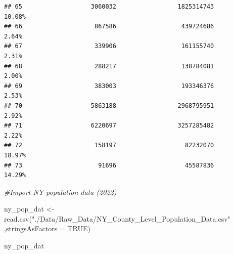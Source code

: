 \documentclass[
  12pt,
]{article}
\newenvironment{Shaded}{\begin{snugshade}}{\end{snugshade}}
\newcommand{\AttributeTok}[1]{\textcolor[rgb]{0.77,0.63,0.00}{#1}}
\newcommand{\CommentTok}[1]{\textcolor[rgb]{0.56,0.35,0.01}{\textit{#1}}}
\newcommand{\ConstantTok}[1]{\textcolor[rgb]{0.00,0.00,0.00}{#1}}
\newcommand{\FunctionTok}[1]{\textcolor[rgb]{0.00,0.00,0.00}{#1}}
\newcommand{\NormalTok}[1]{#1}
\newcommand{\OtherTok}[1]{\textcolor[rgb]{0.56,0.35,0.01}{#1}}
\newcommand{\StringTok}[1]{\textcolor[rgb]{0.31,0.60,0.02}{#1}}
\begin{document}
\begin{verbatim}
## 65                   3060032                 1825314743               10.08%
## 66                    867586                  439724686                2.64%
## 67                    339906                  161155740                2.31%
## 68                    288217                  138784081                2.00%
## 69                    383003                  193346376                2.53%
## 70                   5863188                 2968795951                2.92%
## 71                   6220697                 3257285482                2.22%
## 72                    158197                   82232070               18.97%
## 73                     91696                   45587836               14.29%
\end{verbatim}

\begin{Shaded}
\begin{Highlighting}[]
\CommentTok{\#Import NY population data (2022)}

\NormalTok{ny\_pop\_dat }\OtherTok{\textless{}{-}} \FunctionTok{read.csv}\NormalTok{(}\StringTok{"./Data/Raw\_Data/NY\_County\_Level\_Population\_Data.csv"}
\NormalTok{                       ,}\AttributeTok{stringsAsFactors =} \ConstantTok{TRUE}\NormalTok{)}

\NormalTok{ny\_pop\_dat}
\end{Highlighting}
\end{Shaded}
\end{document}
